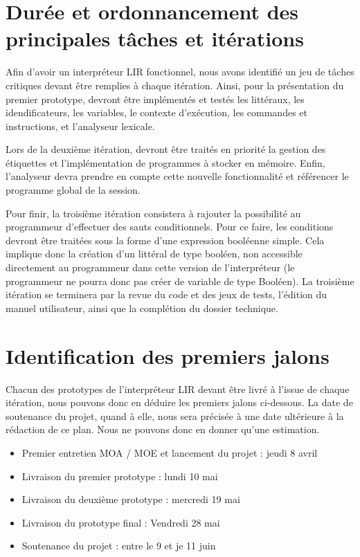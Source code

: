 \documentclass[12pt,a4paper,titlepage,openany, oneside]{report}
\begin{document}
    \section{Durée et ordonnancement des principales tâches et itérations}
        Afin d'avoir un interpréteur LIR fonctionnel, nous avons identifié un jeu de
        tâches critiques devant être remplies à chaque itération. Ainsi, pour la
        présentation du premier prototype, devront être implémentés et testés les
        littéraux, les idendificateurs, les variables, le contexte d'exécution, les
        commandes et instructions, et l'analyseur lexicale.

        Lors de la deuxième itération, devront être traités en priorité la gestion des
        étiquettes et l'implémentation de programmes à stocker en mémoire. Enfin,
        l'analyseur devra prendre en compte cette nouvelle fonctionnalité et référencer
        le programme global de la session.

        Pour finir, la troisième itération consistera à rajouter la possibilité au
        programmeur d'effectuer des sauts conditionnels. Pour ce faire, les conditions
        devront être traitées sous la forme d'une expression booléenne simple. Cela
        implique donc la création d'un littéral de type booléen, non accessible directement
        au programmeur dans cette version de l'interpréteur (le programmeur ne pourra donc
        pas créer de variable de type Booléen). La troisième itération se terminera par
        la revue du code et des jeux de tests, l'édition du manuel utilisateur, ainsi que
        la complétion du dossier technique.

    \section{Identification des premiers jalons}
        Chacun des prototypes de l'interpréteur LIR devant être livré à l'issue de chaque
        itération, nous pouvons donc en déduire les premiers jalons ci-dessous. La date de
        soutenance du projet, quand à elle, nous sera précisée à une date ultérieure à
        la rédaction de ce plan. Nous ne pouvons donc en donner qu'une estimation.

        \begin{itemize}
            \item Premier entretien MOA / MOE et lancement du projet :
                  jeudi 8 avril
            \item Livraison du premier prototype : lundi 10 mai
            \item Livraison du deuxième prototype : mercredi 19 mai
            \item Livraison du prototype final : Vendredi 28 mai
            \item Soutenance du projet : entre le 9 et je 11 juin
        \end{itemize}
\end{document}

